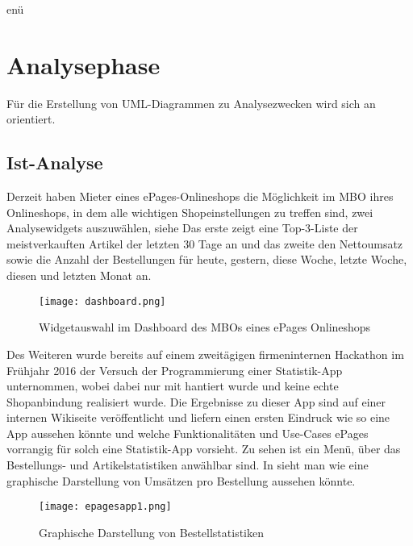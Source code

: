 enü%
\section{Analysephase} 
\label{sec:Analysephase}

Für die Erstellung von \acs{UML}-Diagrammen zu Analysezwecken wird sich an \citep{UML} orientiert.

\subsection{Ist-Analyse} 
\label{sec:IstAnalyse}
Derzeit haben Mieter eines ePages-Onlineshops die Möglichkeit im \acs{MBO} ihres Onlineshops, in dem alle wichtigen Shopeinstellungen zu treffen sind, zwei Analysewidgets auszuwählen, siehe  Das erste zeigt eine Top-3-Liste der meistverkauften Artikel der letzten 30 Tage an und das zweite den Nettoumsatz sowie die Anzahl der Bestellungen für heute, gestern, diese Woche, letzte Woche, diesen und letzten Monat an.
\begin{figure}[htb]
\begin{center}
\texttt{[image: dashboard.png]}
\caption{Widgetauswahl im Dashboard des \acs{MBO}s eines ePages Onlineshops}
\label{fig:dashboard}
\end{center}
\end{figure}
Des Weiteren wurde bereits auf einem zweitägigen firmeninternen Hackathon im Frühjahr 2016 der Versuch der Programmierung einer Statistik-App unternommen, wobei dabei nur mit   hantiert wurde und keine echte Shopanbindung realisiert wurde. Die Ergebnisse zu dieser App sind auf einer internen Wikiseite veröffentlicht und liefern einen ersten Eindruck wie so eine App aussehen könnte und welche Funktionalitäten und Use-Cases ePages vorrangig für solch eine Statistik-App vorsieht. Zu sehen ist ein Menü, über das Bestellungs- und Artikelstatistiken anwählbar sind. In  sieht man wie eine graphische Darstellung von Umsätzen pro Bestellung aussehen könnte.

\begin{figure}[htb]
\begin{center}
\texttt{[image: epagesapp1.png]}
\caption{Graphische Darstellung von Bestellstatistiken}
\label{fig:order}
\end{center}
\end{figure}

\newpage

